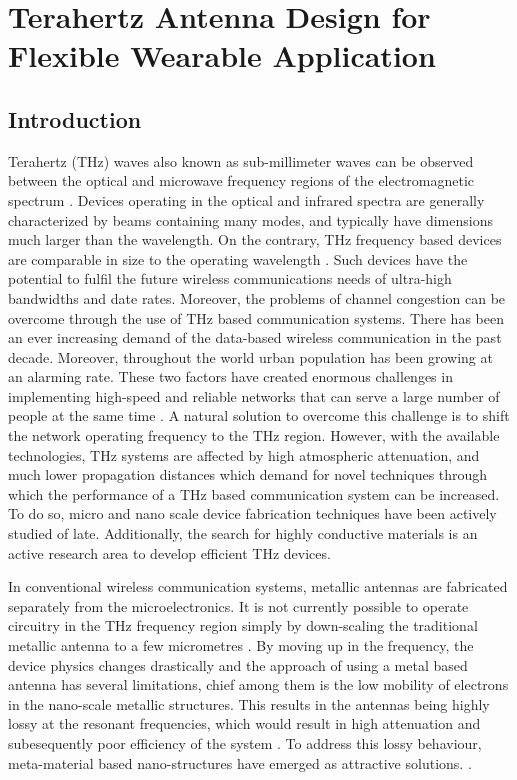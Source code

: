 \documentclass[12pt]{suhbook}
\begin{document}
\setcounter{chapter}{3}%
\chapter{Terahertz Antenna Design for Flexible Wearable Application}
\section{Introduction}
Terahertz (THz) waves also known as sub-millimeter waves can be observed between the optical and microwave frequency regions of the electromagnetic spectrum \cite{liu2009advanced,grischkowsky1990far}. Devices operating in the optical and infrared spectra are generally characterized by beams containing many modes, and typically have dimensions much larger than the wavelength. On the contrary, THz frequency based devices are comparable in size to the operating wavelength \cite{shi2018thz}. Such devices have the potential to fulfil the future wireless communications needs of ultra-high bandwidths and date rates. Moreover, the problems of channel congestion can be overcome through the use of THz based communication systems. 
There has been an ever increasing demand of the data-based wireless communication in the past decade. Moreover, throughout the world urban population has been growing at an alarming rate. These two factors have created enormous challenges in implementing high-speed and reliable networks that can serve a large number of people at the same time \cite{song2011present}. A natural solution to overcome this challenge is to shift the network operating frequency to the THz region. However, with the available technologies, THz systems are affected by high atmospheric attenuation, and much lower propagation distances which demand for novel techniques through which the performance of a THz based communication system can be increased. To do so, micro and nano scale device fabrication techniques have been actively studied of late. Additionally, the search for highly conductive materials is an active research area to develop  efficient THz devices.

In conventional wireless communication systems, metallic antennas are fabricated separately from the microelectronics. It is not currently possible to operate circuitry in the THz frequency region simply by down-scaling the traditional metallic antenna to a few micrometres \cite{kleine2011review}. By moving up in the frequency, the device physics changes drastically and the approach of using a metal based antenna has several limitations, chief among them is the low mobility of electrons in the nano-scale metallic structures. This results in the antennas being highly lossy at the resonant frequencies, which would result in high attenuation and subesequently poor efficiency of the system \cite{pourahmadazar2018millimeter}. To address this lossy behaviour, meta-material based nano-structures have emerged as attractive solutions. \cite{chen2006active}.
% 
% 
% 
\end{document}
